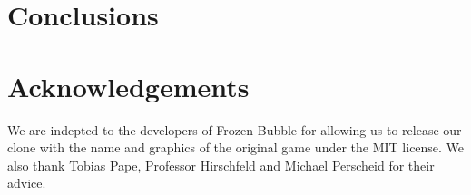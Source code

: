 \section{Conclusions}

\section*{Acknowledgements}
We are indepted to the developers of Frozen Bubble for allowing us to release 
our clone with the name and graphics of the original game under the MIT 
license. We also thank Tobias Pape, Professor Hirschfeld and Michael Perscheid for 
their advice.

